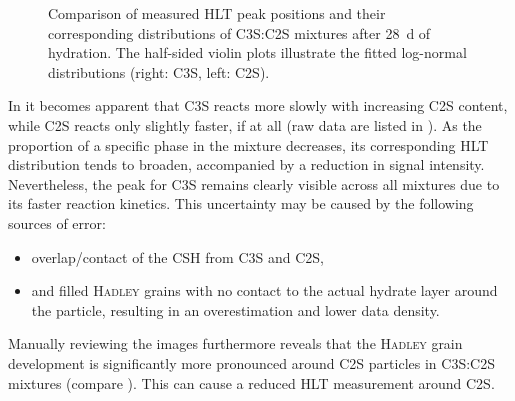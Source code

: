 \begin{figure}[t]
    \caption{
        Comparison of measured \ac{HLT} peak positions and their corresponding distributions of \ac{C3S}:\ac{C2S} mixtures after \qty{28}{\day} of hydration.
        The half-sided violin plots illustrate the fitted log-normal distributions (right: {\color{red}\ac{C3S}}, left: {\color{blue}\ac{C2S}}).
    }
    \label{fig:hydration-rim-mixture-results}
\end{figure}


In  it becomes apparent that \ac{C3S} reacts more slowly with increasing \ac{C2S} content, while \ac{C2S} reacts only slightly faster, if at all (raw data are listed in ).
As the proportion of a specific phase in the mixture decreases, its corresponding \ac{HLT} distribution tends to broaden, accompanied by a reduction in signal intensity.
Nevertheless, the peak for \ac{C3S} remains clearly visible across all mixtures due to its faster reaction kinetics.
This uncertainty may be caused by the following sources of error:
\begin{itemize}
	\item overlap/contact of the \ac{CSH} from \ac{C3S} and \ac{C2S},
	\item and filled \textsc{Hadley} grains with no contact to the actual hydrate layer around the particle, resulting in an overestimation and lower data density.
\end{itemize}

Manually reviewing the images furthermore reveals that the \textsc{Hadley} grain development is significantly more pronounced around \ac{C2S} particles in \ac{C3S}:\ac{C2S} mixtures (compare ).
This can cause a reduced \ac{HLT} measurement around \ac{C2S}.


